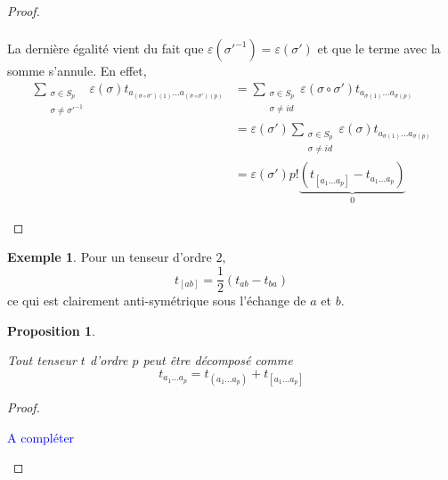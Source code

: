 \documentclass[a4paper,11pt]{report}
\theoremstyle{definition}
\theoremstyle{plain}
\newtheorem{prop}[thm]{Proposition}
\theoremstyle{definition}
\newtheorem{exmp}{Exemple}[chapter]
\theoremstyle{remark}
\newcommand{\comp}{\begin{center}\textcolor{blue}{A compléter}\end{center}}
\begin{document}
\begin{proof}
\begin{enumerate}[label = \textit{\roman*)}]
\begin{align}
                        \end{align}
                        La dernière égalité vient du fait que $ \varepsilon(\sigma'^{-1}) =  \varepsilon(\sigma')$ et que le terme avec la somme s'annule. En effet,
                        \begin{align}
                            \sum_{\substack{\sigma\in S_p\\\sigma\neq\sigma'^{-1}}} \varepsilon(\sigma) t_{a_{(\sigma\circ\sigma')(1)}\dots a_{(\sigma\circ\sigma')(p)}} 
                            &= \sum_{\substack{\sigma\in S_p\\\sigma\neq id}} \varepsilon(\sigma\circ\sigma') t_{a_{\sigma(1)}\dots a_{\sigma(p)}} \\
                            &= \varepsilon(\sigma')\sum_{\substack{\sigma\in S_p\\\sigma\neq id}} \varepsilon(\sigma) t_{a_{\sigma(1)}\dots a_{\sigma(p)}}\\
                            &= \varepsilon(\sigma') p!\underbrace{\left( t_{[a_1\dots a_p]}-t_{a_1\dots a_p} \right)}_{0}
                        \end{align}
                    \end{enumerate}
                \end{proof}
                
                \begin{exmp}
                    Pour un tenseur d'ordre $2$,
                    \begin{equation}
                        t_{[ab]} = \frac{1}{2}(t_{ab}-t_{ba})
                    \end{equation}
                    ce qui est clairement anti-symétrique sous l'échange de $a$ et $b$. 
                \end{exmp}
                
                \begin{prop}\begin{leftbar}
                    Tout tenseur $t$ d'ordre $p$ peut être décomposé comme
                    \begin{equation}
                        t_{a_1\dots a_p} = t_{(a_1\dots a_p)} + t_{[a_1\dots a_p]}
                    \end{equation}
                \end{leftbar}\end{prop}
                
                \begin{proof}${}$\\
                    \comp
                \end{proof}
                
\end{document}
